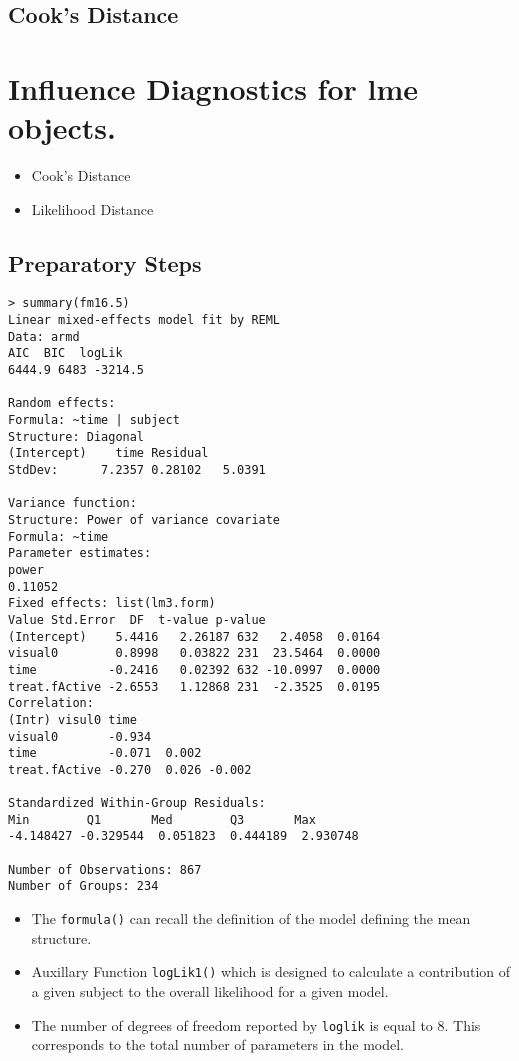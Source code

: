 \documentclass[a4paper,12pt]{article}
\begin{document}
\subsection{Cook's Distance}



\section{Influence Diagnostics for lme objects.}

\begin{itemize}
\item Cook's Distance
\item Likelihood Distance
\end{itemize}

\subsection{Preparatory Steps}


\begin{verbatim}
> summary(fm16.5)
Linear mixed-effects model fit by REML
Data: armd 
AIC  BIC  logLik
6444.9 6483 -3214.5

Random effects:
Formula: ~time | subject
Structure: Diagonal
(Intercept)    time Residual
StdDev:      7.2357 0.28102   5.0391

Variance function:
Structure: Power of variance covariate
Formula: ~time 
Parameter estimates:
power 
0.11052 
Fixed effects: list(lm3.form) 
Value Std.Error  DF  t-value p-value
(Intercept)    5.4416   2.26187 632   2.4058  0.0164
visual0        0.8998   0.03822 231  23.5464  0.0000
time          -0.2416   0.02392 632 -10.0997  0.0000
treat.fActive -2.6553   1.12868 231  -2.3525  0.0195
Correlation: 
(Intr) visul0 time  
visual0       -0.934              
time          -0.071  0.002       
treat.fActive -0.270  0.026 -0.002

Standardized Within-Group Residuals:
Min        Q1       Med        Q3       Max 
-4.148427 -0.329544  0.051823  0.444189  2.930748 

Number of Observations: 867
Number of Groups: 234 
\end{verbatim}
\newpage

\begin{itemize}
\item The \texttt{formula()} can recall the definition of the model defining the mean structure.

\item Auxillary Function \texttt{logLik1()} which is designed to calculate a contribution of a given subject to the overall likelihood for a given model.

\item 
The number of degrees of freedom reported by \texttt{loglik} is equal to 8. This corresponds
to the total number of parameters in the model.
\end{itemize}
\end{document}
